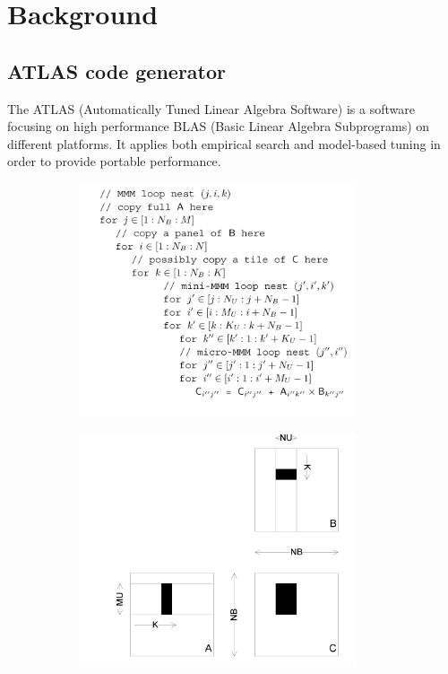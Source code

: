 \section{Background}
\label{sec:background}

  \subsection{ATLAS code generator}
  \label{sec:atlas_intro}
  The ATLAS (Automatically Tuned Linear Algebra Software) is a software focusing on high performance 
  BLAS (Basic Linear Algebra Subprograms) on different platforms. It applies both empirical search and model-based 
  tuning in order to provide portable performance. \par
  

  \begin{figure}
  \centering
  \begin{subfigure}{1.0\linewidth}
    \centering
    \includegraphics[width=0.9\textwidth]{images/ATLAS_code.png}
    \caption{}
    \label{fig:ATLAS_code}
  \end{subfigure}
  \begin{subfigure}[t]{1.0\linewidth}
    \centering
    \includegraphics[width=0.9\textwidth]{images/ATLAS_pic.png}

\end{subfigure}
\end{figure}
